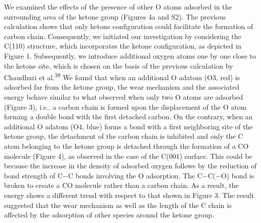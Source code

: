 \documentclass{article}
\begin{document}
We examined the effects of the presence of other O atoms adsorbed in the surrounding area of the ketone group (Figures 4a and S2). The previous calculation shows that only ketone configuration could facilitate the formation of carbon chain. Consequently, we initiated our investigation by considering the C(110) structure, which incorporates the ketone configuration, as depicted in Figure 1. Subsequently, we introduce additional oxygen atoms one by one close to the ketone site, which is chosen on the basis of the previous calculation by Chaudhuri et al.\textsuperscript{38} We found that when an additional O adatom (O3, red) is adsorbed far from the ketone group, the wear mechanism and the associated energy behave similar to what observed when only two O atoms are adsorbed (Figure 3), i.e., a carbon chain is formed upon the displacement of the O atom forming a double bond with the first detached carbon. On the contrary, when an additional O adatom (O4, blue) forms a bond with a first neighboring site of the ketone group, the detachment of the carbon chain is inhibited and only the C atom belonging to the ketone group is detached through the formation of a CO molecule (Figure 4), as observed in the case of the C(001) surface. This could be because the increase in the density of adsorbed oxygen follows by the reduction of bond strength of C−C bonds involving the O adsorption. The C−C(−O) bond is broken to create a CO molecule rather than a carbon chain. As a result, the energy shows a different trend with respect to that shown in Figure 3. The result suggested that the wear mechanism as well as the length of the C chain is affected by the adsorption of other species around the ketone group.
\end{document}
